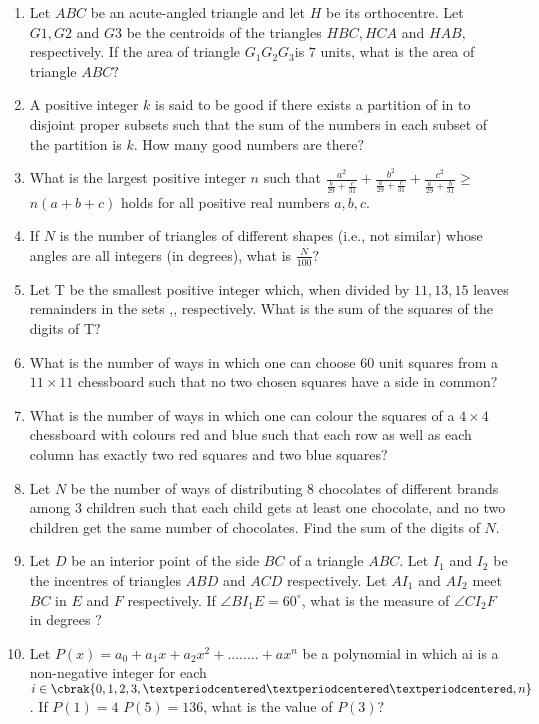 \documentclass{article}
\begin{document}
\begin{enumerate}
\item  Let $ABC$ be an acute-angled triangle and let $H$ be its orthocentre. Let $G1, G2 $ and $G3$ be the centroids of the triangles $HBC, HCA $ and $ HAB,$ respectively. If the area of triangle $G_1G_2G_3 $is $7$ units, what is the area of triangle $ABC?$
\item  A positive integer $k$ is said to be good if there exists a partition of  in to disjoint proper subsets such that the sum of the numbers in each subset of the partition is $k.$ How many good numbers are there$?$
\item  What is the largest positive integer $n$ such that $ \frac{a^2}{\frac{b}{29} + \frac{c}{31}} + \frac{b^2}{\frac{a}{29} +\frac{c}{31}} + \frac{c^2}{\frac{a}{29} + \frac{b}{31}} \geq$  $ n (a + b + c) $ holds for all positive real numbers $a, b, c.$ 
\item  If $N$ is the number of triangles of different shapes (i.e., not similar) whose angles are all integers (in degrees), what is $\frac{N}{100}?$ 
\item  Let T be the smallest positive integer which, when divided by $11, 13, 15$ leaves remainders in the sets  ,, respectively. What is the sum of the squares of the digits of T$?$ 
\item  What is the number of ways in which one can choose $60$ unit squares from a $11 \times 11 $ chessboard such that no two chosen squares have a side in common$?$
\item What is the number of ways in which one can colour the squares of a $4\times4$ chessboard with colours red and blue such that each row as well as each column has exactly two red squares and two blue squares$?$ 
\item  Let $N$ be the number of ways of distributing $8$ chocolates of different brands among $3$ children such that each child gets at least one chocolate, and no two children get the same number of chocolates. Find the sum of the digits of $N.$
\item  Let $D$ be an interior point of the side $ BC $ of a triangle $ ABC $. Let $ I_1 $ and $ I_2 $ be the incentres of triangles $ ABD $ and $ ACD $ respectively. Let $ AI_1 $ and $ AI_2 $ meet $ BC $ in $ E $ and $ F $ respectively. If $ \angle BI_1E = 60^\circ $, what is the measure of $ \angle CI_2F$ in degrees $?$
\item Let $P(x)= a_0 + a_1x+ a_2x^{2} +........ + ax^{n} $  be a polynomial in which ai is a non-negative integer for each $ i \in \cbrak {0, 1, 2, 3, ·· · ,n}$. If $P(1) = 4$ $P(5) = 136$, what is the value of $P(3)?$
\end{enumerate}
\end{document}
